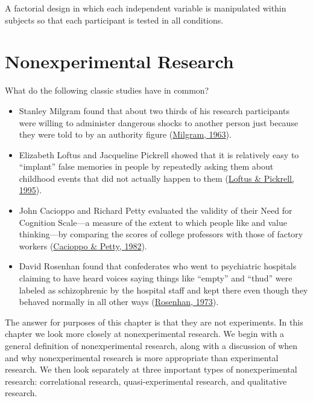 \documentclass[
]{krantz}
\providecommand{\tightlist}{%
  \setlength{\itemsep}{0pt}\setlength{\parskip}{0pt}}
\begin{document}
A factorial design in which each independent variable is manipulated within subjects so that each participant is tested in all conditions.

\hypertarget{nonexperimental-research}{%
\chapter{Nonexperimental Research}\label{nonexperimental-research}}

What do the following classic studies have in common?

\begin{itemize}
\tightlist
\item
  Stanley Milgram found that about two thirds of his research participants were willing to administer dangerous shocks to another person just because they were told to by an authority figure (\protect\hyperlink{ref-milgram1963behavioral}{Milgram, 1963}).
\item
  Elizabeth Loftus and Jacqueline Pickrell showed that it is relatively easy to ``implant'' false memories in people by repeatedly asking them about childhood events that did not actually happen to them (\protect\hyperlink{ref-loftus1995formation}{Loftus \& Pickrell, 1995}).
\item
  John Cacioppo and Richard Petty evaluated the validity of their Need for Cognition Scale---a measure of the extent to which people like and value thinking---by comparing the scores of college professors with those of factory workers (\protect\hyperlink{ref-cacioppo1982need}{Cacioppo \& Petty, 1982}).
\item
  David Rosenhan found that confederates who went to psychiatric hospitals claiming to have heard voices saying things like ``empty'' and ``thud'' were labeled as schizophrenic by the hospital staff and kept there even though they behaved normally in all other ways (\protect\hyperlink{ref-rosenhan1973being}{Rosenhan, 1973}).
\end{itemize}

The answer for purposes of this chapter is that they are not experiments. In this chapter we look more closely at nonexperimental research. We begin with a general definition of nonexperimental research, along with a discussion of when and why nonexperimental research is more appropriate than experimental research. We then look separately at three important types of nonexperimental research: correlational research, quasi-experimental research, and qualitative research.
\end{document}
